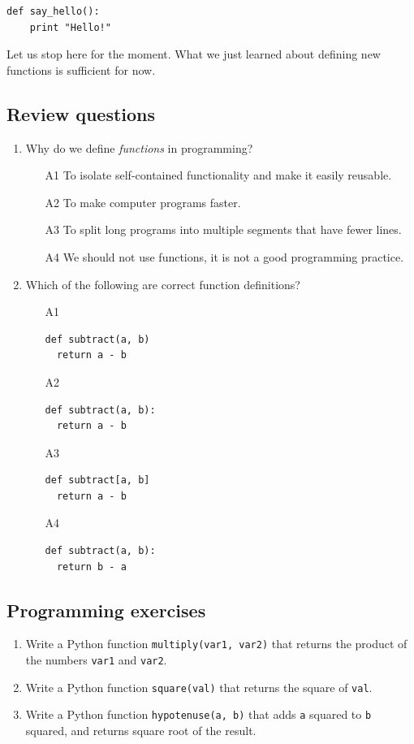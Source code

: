 \begin{verbatim}
def say_hello():
    print "Hello!"
\end{verbatim}
Let us stop here for the moment. What we just learned about defining new functions is 
sufficient for now.

\subsection{Review questions}

\begin{enumerate}
\item Why do we define {\em functions} in programming? 
\begin{enumerate}
\item[A1] To isolate self-contained functionality and make it easily reusable.
\item[A2] To make computer programs faster.
\item[A3] To split long programs into multiple segments that have fewer lines.
\item[A4] We should not use functions, it is not a good programming practice.
\end{enumerate}
\item Which of the following are correct function definitions?
\begin{enumerate}
\item[A1] 
\begin{verbatim}
def subtract(a, b)
  return a - b
\end{verbatim}
\item[A2] 
\begin{verbatim}
def subtract(a, b):
  return a - b
\end{verbatim}
\item[A3] 
\begin{verbatim}
def subtract[a, b]
  return a - b
\end{verbatim}
\item[A4] 
\begin{verbatim}
def subtract(a, b):
  return b - a
\end{verbatim}
\end{enumerate}
\end{enumerate}

\subsection{Programming exercises}

\begin{enumerate}
\item Write a Python function {\tt multiply(var1, var2)} that returns the product of the 
      numbers {\tt var1} and {\tt var2}.
\item Write a Python function {\tt square(val)} that returns the square of {\tt val}.
\item Write a Python function {\tt hypotenuse(a, b)} that adds {\tt a} squared to {\tt b} squared,
      and returns square root of the result.
\end{enumerate}

